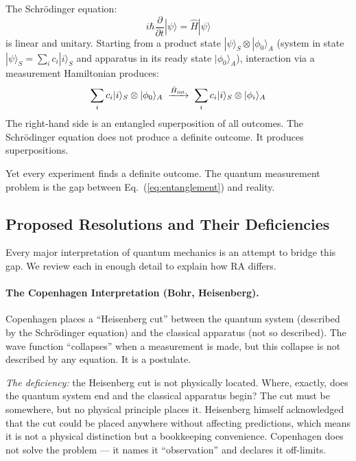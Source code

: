 \documentclass[12pt,a4paper]{article}
\begin{document}
The Schr\"odinger equation:
\begin{equation}
  i\hbar\frac{\partial}{\partial t}|\psi\rangle = \hat{H}|\psi\rangle
  \label{eq:schrodinger}
\end{equation}
is linear and unitary.  Starting from a product state $|\psi\rangle_S\otimes|\phi_0\rangle_A$ (system in state $|\psi\rangle_S = \sum_i c_i|i\rangle_S$ and apparatus in its ready state $|\phi_0\rangle_A$), interaction via a measurement Hamiltonian produces:
\begin{equation}
  \sum_i c_i|i\rangle_S\otimes|\phi_0\rangle_A \;\xrightarrow{\hat{H}_{\rm int}}\; \sum_i c_i|i\rangle_S\otimes|\phi_i\rangle_A
  \label{eq:entanglement}
\end{equation}
The right-hand side is an entangled superposition of all outcomes.  The Schr\"odinger equation does not produce a definite outcome.  It produces superpositions.

Yet every experiment finds a definite outcome.  The quantum measurement problem is the gap between Eq.~(\ref{eq:entanglement}) and reality.

\subsection{Proposed Resolutions and Their Deficiencies}

Every major interpretation of quantum mechanics is an attempt to bridge this gap.  We review each in enough detail to explain how RA differs.

\paragraph{The Copenhagen Interpretation (Bohr, Heisenberg).}
Copenhagen places a ``Heisenberg cut'' between the quantum system (described by the Schr\"odinger equation) and the classical apparatus (not so described).  The wave function ``collapses'' when a measurement is made, but this collapse is not described by any equation.  It is a postulate.

\textit{The deficiency:} the Heisenberg cut is not physically located.  Where, exactly, does the quantum system end and the classical apparatus begin?  The cut must be somewhere, but no physical principle places it.  Heisenberg himself acknowledged that the cut could be placed anywhere without affecting predictions, which means it is not a physical distinction but a bookkeeping convenience.  Copenhagen does not solve the problem --- it names it ``observation'' and declares it off-limits.
\end{document}
